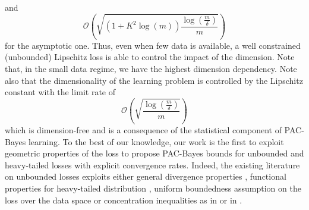 and $$\mathcal{O}\left(\sqrt{(1+K^2\log(m))\frac{\log\left( \frac{m}{\delta} \right)}{m}}\right)$$ for the asymptotic one.
Thus, even when few data is available, a well constrained (unbounded) Lipschitz loss is able to control the impact of the dimension.
Note that, in the small data regime, we have the highest dimension dependency. Note also that the dimensionality of the learning problem is controlled by the Lipschitz constant with the limit rate of $$\mathcal{O}\left(\sqrt{\frac{\log\left( \frac{m}{\delta} \right)}{m}}\right)$$ which is dimension-free and is a consequence of the statistical component of PAC-Bayes learning.
To the best of our knowledge, our work is the first to exploit geometric properties of the loss to propose PAC-Bayes bounds for unbounded and heavy-tailed losses with explicit convergence rates. Indeed, the existing literature on unbounded losses exploits either general divergence properties \citep{alquier2018simpler,picard2022change}, functional properties for heavy-tailed distribution \citep{holland2019pac}, uniform boundedness assumption on the loss over the data space \citep{haddouche2021pac} or concentration inequalities as in  or in \citet{kuzborskij2019efron,rivasplata2020pac,jang2023tight}.

